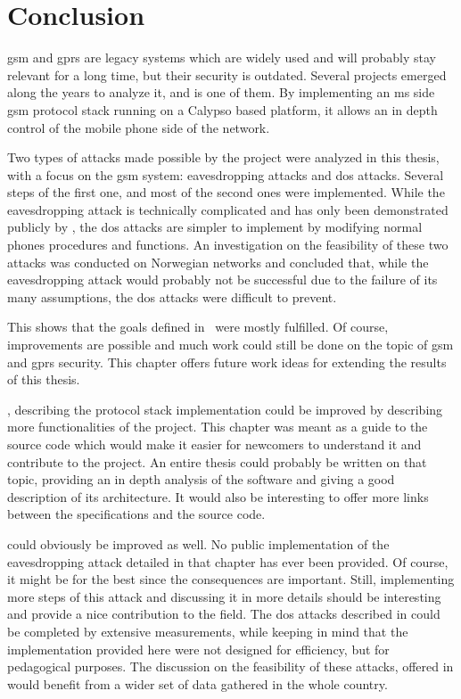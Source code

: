 \chapter{Conclusion} \label{chap:conclusion}

  \gls{gsm} and \gls{gprs} are legacy systems which are widely used and
  will probably stay relevant for a long time, but their security is
  outdated. Several projects emerged along the years to analyze it, and
   is one of them. By implementing an \gls{ms} side
  \gls{gsm} protocol stack running on a Calypso based platform, it
  allows an in depth control of the mobile phone side of the network. 

  Two types of attacks made possible by the  project
  were analyzed in this thesis, with a focus on the \gls{gsm} system:
  eavesdropping attacks and \gls{dos} attacks. Several steps of the
  first one, and most of the second ones were implemented. While the
  eavesdropping attack is technically complicated and has only been
  demonstrated publicly by , the \gls{dos} attacks
  are simpler to implement by modifying normal phones procedures and
  functions. An investigation on the feasibility of these two attacks
  was conducted on Norwegian networks and concluded that, while the
  eavesdropping attack would probably not be successful due to the
  failure of its many
  assumptions, the \gls{dos} attacks were difficult to prevent.

  This shows that the goals defined in~ were mostly
  fulfilled. Of course, improvements are possible and much work
  could still be done on the topic of \gls{gsm} and \gls{gprs}
  security. This chapter offers future work ideas for extending the
  results of this thesis.

  , describing the protocol
  stack implementation  could be improved by describing
  more functionalities of the project. This chapter was meant as a
  guide to the source code which would make it easier for newcomers to
  understand it and contribute to the project. An entire thesis could
  probably be written on that topic, providing an in depth analysis of
  the software and giving a good description of its architecture. It
  would also be interesting to offer more links between the
  specifications and the source code.

   could obviously be improved as well.
  No public implementation of the eavesdropping attack detailed in that
  chapter has ever been provided. Of course, it might be for the best
  since the consequences are important. Still, implementing more steps
  of this attack and discussing it in more details should be interesting
  and provide a nice contribution to the field. The \gls{dos} attacks
  described in  could be completed by extensive
  measurements, while keeping in mind that the implementation provided
  here were not designed for efficiency, but for pedagogical purposes.
  The discussion on the feasibility of these attacks, offered in
   would
  benefit from a wider set of data gathered in the whole country. 

